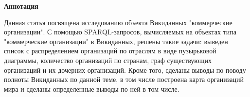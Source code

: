 \textbf{Аннотация}

Данная статья посвящена исследованию объекта Викиданных "коммерческие организации". С помощью SPARQL-запросов, вычисляемых на объектах типа "коммерческие организации" в Викиданных, решены такие задачи: выведен список с распределением организаций по отраслям в виде пузырьковой диаграммы, количество организаций по странам, граф существующих организаций и их дочерних организаций. Кроме того, сделаны выводы по поводу полноты Викиданных по данной теме, в том числе построена карта организаций мира и сделаны определенные выводы по ней в том числе.